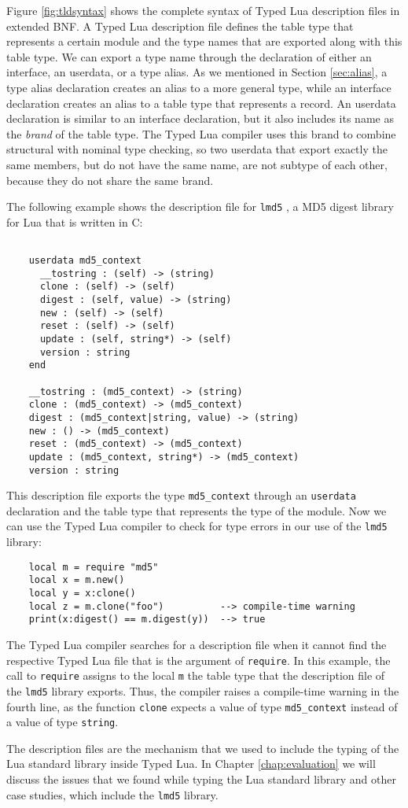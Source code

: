 Figure \ref{fig:tldsyntax} shows the complete syntax of Typed Lua
description files in extended BNF.
A Typed Lua description file defines the table type that represents
a certain module and the type names that are exported
along with this table type.
We can export a type name through the declaration of either an interface,
an userdata, or a type alias.
As we mentioned in Section \ref{sec:alias}, a type alias declaration
creates an alias to a more general type, while an interface declaration
creates an alias to a table type that represents a record.
An userdata declaration is similar to an interface declaration,
but it also includes its name as the \emph{brand} of the table type.
The Typed Lua compiler uses this brand to combine structural with
nominal type checking, so two userdata that export exactly the same members,
but do not have the same name, are not subtype of each other,
because they do not share the same brand.

The following example shows the description file for \texttt{lmd5} \cite{lmd5},
a MD5 digest library for Lua that is written in C:
\begin{verbatim}

    userdata md5_context
      __tostring : (self) -> (string)
      clone : (self) -> (self)
      digest : (self, value) -> (string)
      new : (self) -> (self)
      reset : (self) -> (self)
      update : (self, string*) -> (self)
      version : string
    end

    __tostring : (md5_context) -> (string)
    clone : (md5_context) -> (md5_context)
    digest : (md5_context|string, value) -> (string)
    new : () -> (md5_context)
    reset : (md5_context) -> (md5_context)
    update : (md5_context, string*) -> (md5_context)
    version : string
\end{verbatim}

This description file exports the type \texttt{md5\string_context}
through an \texttt{userdata} declaration and the table type that
represents the type of the module.
Now we can use the Typed Lua compiler to check for type errors in
our use of the \texttt{lmd5} library:
\begin{verbatim}
    local m = require "md5"
    local x = m.new()
    local y = x:clone()
    local z = m.clone("foo")          --> compile-time warning
    print(x:digest() == m.digest(y))  --> true
\end{verbatim}

The Typed Lua compiler searches for a
description file when it cannot find the respective Typed Lua file
that is the argument of \texttt{require}.
In this example, the call to \texttt{require} assigns to the local
\texttt{m} the table type that the description file of the \texttt{lmd5}
library exports. 
Thus, the compiler raises a compile-time warning in the fourth line,
as the function \texttt{clone} expects a value of type
\texttt{md5\string_context} instead of a value of type \texttt{string}.

The description files are the mechanism that we used to include the
typing of the Lua standard library inside Typed Lua.
In Chapter \ref{chap:evaluation} we will discuss the issues that we
found while typing the Lua standard library and other case studies,
which include the \texttt{lmd5} library. 

